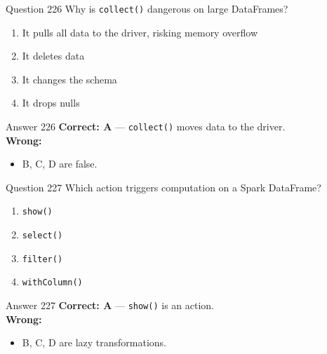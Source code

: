 \documentclass[aspectratio=169,11pt]{beamer}
\begin{document}
	\begin{frame}{Question 226}
		Why is \texttt{collect()} dangerous on large DataFrames?
		\begin{enumerate}[label=\Alph*.]
			\item It pulls all data to the driver, risking memory overflow
			\item It deletes data
			\item It changes the schema
			\item It drops nulls
		\end{enumerate}
	\end{frame}
	\begin{frame}{Answer 226}
		\textbf{Correct: A} --- \texttt{collect()} moves data to the driver.\\
		\vspace{0.5em}
		\textbf{Wrong:}
		\begin{itemize}
			\item B, C, D are false.
		\end{itemize}
	\end{frame}
	
	\begin{frame}{Question 227}
		Which action triggers computation on a Spark DataFrame?
		\begin{enumerate}[label=\Alph*.]
			\item \texttt{show()}
			\item \texttt{select()}
			\item \texttt{filter()}
			\item \texttt{withColumn()}
		\end{enumerate}
	\end{frame}
	\begin{frame}{Answer 227}
		\textbf{Correct: A} --- \texttt{show()} is an action.\\
		\vspace{0.5em}
		\textbf{Wrong:}
		\begin{itemize}
			\item B, C, D are lazy transformations.
		\end{itemize}
	\end{frame}
	
\end{document}
